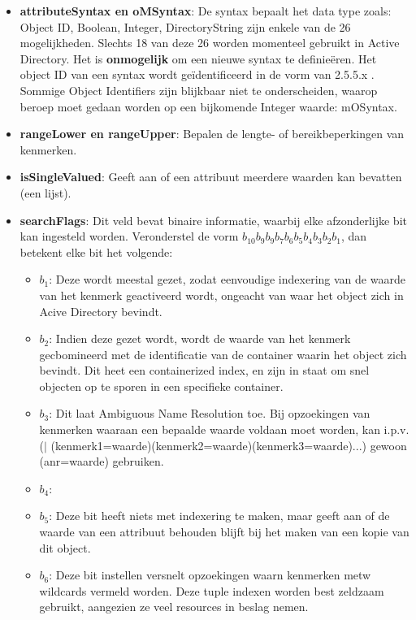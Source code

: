 \documentclass{report}
\begin{document}
\begin{enumerate}
		 { 
			\begin{itemize}
				\item \textbf{attributeSyntax en oMSyntax}: De syntax bepaalt het data type zoals: Object ID, Boolean, Integer, DirectoryString zijn enkele van de 26 mogelijkheden. Slechts 18 van deze 26 worden momenteel gebruikt in Active Directory. Het is \textbf{onmogelijk} om een nieuwe syntax te definieëren. Het object ID van een syntax wordt geïdentificeerd in de vorm van 2.5.5.x . Sommige Object Identifiers zijn blijkbaar niet te onderscheiden, waarop beroep moet gedaan worden op een bijkomende Integer waarde: mOSyntax.
				\item \textbf{rangeLower en rangeUpper}: Bepalen de lengte- of bereikbeperkingen van kenmerken.
				\item \textbf{isSingleValued}: Geeft aan of een attribuut meerdere waarden kan bevatten (een lijst).
				\item \textbf{searchFlags}: Dit veld bevat binaire informatie, waarbij elke afzonderlijke bit kan ingesteld worden. Veronderstel de vorm $b_{10}b_9b_9b_7b_6b_5b_4b_3b_2b_1$, dan betekent elke bit het volgende:
				\begin{itemize}
					\item \textbf{$b_1$}: Deze wordt meestal gezet, zodat eenvoudige indexering van de waarde van het kenmerk geactiveerd wordt, ongeacht van waar het object zich in Acive Directory bevindt.
					\item \textbf{$b_2$}: Indien deze gezet wordt, wordt de waarde van het kenmerk gecbomineerd met de identificatie van de container waarin het object zich bevindt. Dit heet een containerized index, en zijn in staat om snel objecten op te sporen in een specifieke container.
					\item \textbf{$b_3$}: Dit laat Ambiguous Name Resolution toe. Bij opzoekingen van kenmerken waaraan een bepaalde waarde voldaan moet worden, kan i.p.v. \\ ($\mid$ (kenmerk1=waarde)(kenmerk2=waarde)(kenmerk3=waarde)...) gewoon (anr=waarde) gebruiken. 
					\item \textbf{$b_4$}: 
					\item \textbf{$b_5$}: Deze bit heeft niets met indexering te maken, maar geeft aan of de waarde van een attribuut behouden blijft bij het maken van een kopie van dit object.
					\item \textbf{$b_6$}: Deze bit instellen versnelt opzoekingen waarn kenmerken metw wildcards vermeld worden. Deze tuple indexen worden best zeldzaam gebruikt, aangezien ze veel resources in beslag nemen.

\end{itemize}
\end{itemize}}
\end{enumerate}
\end{document}
